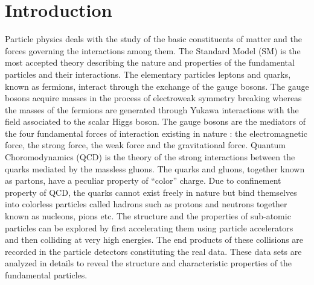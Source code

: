 \chapter{Introduction}
\label{chap:Introduction}

Particle physics deals with the study of the basic constituents of matter and the forces governing the interactions among them. The Standard Model (SM) is the most accepted theory describing the nature and properties of the fundamental particles and their interactions. The elementary particles leptons and quarks, known as fermions, interact through the exchange of the gauge bosons. The gauge bosons acquire masses in the process of electroweak symmetry breaking whereas the masses of the fermions are generated through Yukawa interactions with the field associated to the scalar Higgs boson. The gauge bosons are the mediators of the four fundamental forces of interaction existing in nature : the electromagnetic force, the strong force, the weak force and the gravitational force. Quantum Choromodynamics (QCD) is the theory of the strong interactions between the quarks mediated by the massless gluons. The quarks and gluons, together known as partons, have a peculiar property of ``color'' charge. Due to confinement property of QCD, the quarks cannot exist freely in nature but bind themselves into colorless particles called hadrons such as protons and neutrons together known as nucleons, pions etc. The structure and the properties of sub-atomic particles can be explored by first accelerating them using particle accelerators and then colliding at very high energies. The end products of these collisions are recorded in the particle detectors constituting the real data. These data sets are analyzed in details to reveal the structure and characteristic properties of the fundamental particles.

